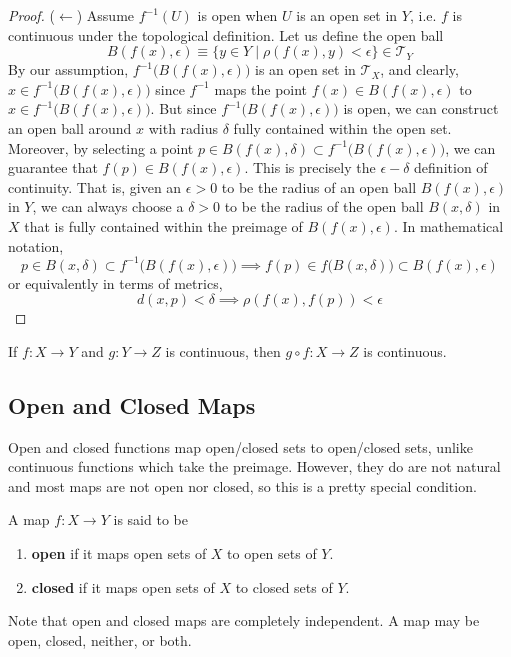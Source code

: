 \begin{proof}
    ($\leftarrow$) Assume $f^{-1}(U)$ is open when $U$ is an open set in $Y$, i.e. $f$ is continuous under the topological definition. Let us define the open ball 
    \[ B(f(x), \epsilon) \equiv \{ y \in Y \; | \; \rho(f(x), y) < \epsilon\} \in \mathscr{T}_Y\]
    By our assumption, $f^{-1} \big( B(f(x), \epsilon) \big)$ is an open set in $\mathscr{T}_X$, and clearly, $x \in f^{-1} \big( B(f(x), \epsilon) \big)$ since $f^{-1}$ maps the point $f(x) \in B(f(x), \epsilon)$ to $x \in f^{-1} \big( B(f(x), \epsilon) \big)$. But since $f^{-1} \big( B(f(x), \epsilon) \big)$ is open, we can construct an open ball around $x$ with radius $\delta$ fully contained within the open set. Moreover, by selecting a point $p \in B(f(x), \delta) \subset f^{-1}\big( B(f(x), \epsilon) \big)$, we can guarantee that $f(p) \in B(f(x), \epsilon)$. This is precisely the $\epsilon - \delta$ definition of continuity. That is, given an $\epsilon > 0$ to be the radius of an open ball $B(f(x), \epsilon)$ in $Y$, we can always choose a $\delta > 0$ to be the radius of the open ball $B(x, \delta)$ in $X$ that is fully contained within the preimage of $B(f(x), \epsilon)$. In mathematical notation, 
    \[ p \in B(x, \delta) \subset f^{-1} \big( B(f(x), \epsilon) \big) \implies f(p) \in f\big( B(x, \delta) \big) \subset B(f(x), \epsilon)\]
    or equivalently in terms of metrics,
    \[ d(x, p) < \delta \implies \rho (f(x), f(p)) < \epsilon\]
  \end{proof} 

  \begin{lemma}
    If $f: X \rightarrow Y$ and $g: Y \rightarrow Z$ is continuous, then $g \circ f :X \rightarrow Z$ is continuous. 
  \end{lemma}

\subsection{Open and Closed Maps}

  Open and closed functions map open/closed sets to open/closed sets, unlike continuous functions which take the preimage. However, they do are not natural and most maps are not open nor closed, so this is a pretty special condition. 

  \begin{definition}
    A map $f: X \rightarrow Y$ is said to be 
    \begin{enumerate}
      \item \textbf{open} if it maps open sets of $X$ to open sets of $Y$. 
      \item \textbf{closed} if it maps open sets of $X$ to closed sets of $Y$. 
    \end{enumerate}
    Note that open and closed maps are completely independent. A map may be open, closed, neither, or both. 
  \end{definition}

